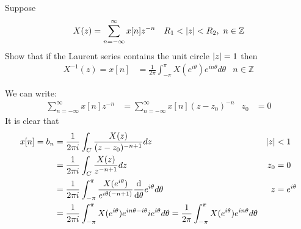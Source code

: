 \documentclass[12pt, english]{book}
\makeatletter
\renewenvironment{proof}[1][\proofname]{\par
	\pushQED{\qed}%
	\normalfont \topsep6\p@\@plus6\p@\relax
	\list{}{%
		\settowidth{\leftmargin}{\itshape\proofname:\hskip\labelsep}%
		\setlength{\labelwidth}{0pt}%
		\setlength{\itemindent}{-\leftmargin}%
		}%
	\item[\hskip\labelsep\itshape#1\@addpunct{:}]\ignorespaces
	}{\popQED\endlist\@endpefalse}
\makeatother
\begin{document}
	\begin{example}[z-Transform]
		\label{z-Transform Inverse Derivation Example - Complex}
		Suppose 
		\begin{align*}
			X(z) &= \sum_{n=-\infty}^{\infty} x[n]z^{-n} & R_1 < \abs{z} < R_2, \ n \in \mathbb{Z}
		\end{align*}
		Show that if the Laurent series contains the unit circle \(\abs{z} = 1\) then 
		\begin{align*}
			X^{-1}(z) = x[n] 
			&= \frac{1}{2\pi} \int_{-\pi}^{\pi} X(e^{i\theta}) e^{in\theta} d\theta & n \in \mathbb{Z}
		\end{align*}
		\begin{proof}
			{\color{Grey}
			We can write:
			\begin{align*}
				\sum_{n=-\infty}^{\infty} x[n]z^{-n} 
				&= \sum_{n=-\infty}^{\infty} x[n](z-z_0)^{-n} & z_0 &= 0
			\end{align*}
			It is clear that
			\begin{align*}
				x[n] = b_n 
				&= \frac{1}{2\pi i} \int_{C} \frac{X(z)}{(z-z_0)^{-n+1}} dz 
					& \abs{z}&<1 \\
				&= \frac{1}{2\pi i} \int_{C} \frac{X(z)}{z^{-n+1}} dz
					& z_0 &= 0 \\
				&= \frac{1}{2\pi i} \int_{-\pi}^{\pi} \frac{X(e^{i\theta})}{e^{i\theta(-n+1)}} \dv{\theta} e^{i\theta}  d\theta
					& z &= e^{i\theta} \\
				&= \frac{1}{2\pi i} \int_{-\pi}^{\pi} X(e^{i\theta}) e^{i n\theta - i\theta}  i e^{i\theta}  d\theta 
				 = \frac{1}{2\pi} \int_{-\pi}^{\pi} X(e^{i\theta}) e^{i n\theta}  d\theta
			\end{align*}
			}
		\end{proof}
	\end{example}
\end{document}
